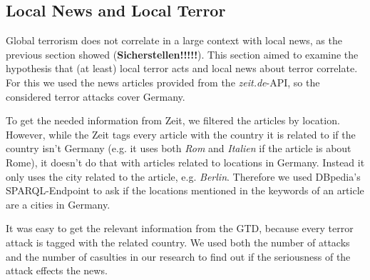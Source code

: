\subsection{Local News and Local Terror}
Global terrorism does not correlate in a large context with local news, as the previous section showed (\textbf{Sicherstellen!!!!!}).
This section aimed to examine the hypothesis that (at least) local terror acts and local news about terror correlate.
For this we used the news articles provided from the \textit{zeit.de}-API,
so the considered terror attacks cover Germany.

To get the needed information from Zeit, we filtered the articles by location. \\
However, while the Zeit tags every article with the country it is related to if the country isn't Germany
(e.g. it uses both \textit{Rom} and \textit{Italien} if the article is about Rome),
it doesn't do that with articles related to locations in Germany.
Instead it only uses the city related to the article, e.g. \textit{Berlin}.
Therefore we used DBpedia's SPARQL-Endpoint to ask if the locations mentioned in the keywords of an article are a cities in Germany.

It was easy to get the relevant information from the GTD,
because every terror attack is tagged with the related country.
We used both the number of attacks and the number of casulties
in our research to find out if the seriousness of the attack effects the news.

